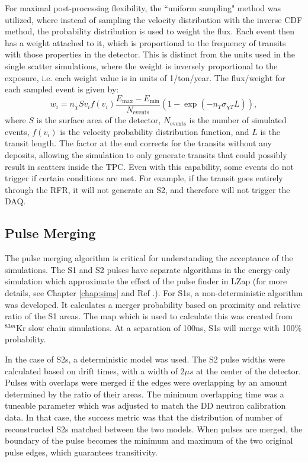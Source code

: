 For maximal post-processing flexibility, the ``uniform sampling" method was utilized, where instead of sampling the velocity distribution with the inverse CDF method, the probability distribution is used to weight the flux.
Each event then has a weight attached to it, which is proportional to the frequency of transits with those properties in the detector.
This is distinct from the units used in the single scatter simulations, where the weight is inversely proportional to the exposure, i.e. each weight value is in units of 1/ton/year.
The flux/weight for each sampled event is given by:
\begin{equation}
    w_i = n_\chi S v_i f(v_i) \frac{E_{\mathrm{max}}-E_{\mathrm{min}}}{N_{\text{events}}} (1-\exp(-n_T \sigma_{\chi T} L)),
\end{equation}
\noindent
where $S$ is the surface area of the detector, $N_{\text{events}}$ is the number of simulated events, $f(v_i)$ is the velocity probability distribution function, and $L$ is the transit length.
The factor at the end corrects for the transits without any deposits, allowing the simulation to only generate transits that could possibly result in scatters inside the TPC.
Even with this capability, some events do not trigger if certain conditions are met.
For example, if the transit goes entirely through the RFR, it will not generate an S2, and therefore will not trigger the DAQ.

\subsection{Pulse Merging}
The pulse merging algorithm is critical for understanding the acceptance of the simulations.
The S1 and S2 pulses have separate algorithms in the energy-only simulation  which approximate the effect of the pulse finder in LZap (for more details, see Chapter \ref{chap:sims} and Ref \cite{akerib_simulations_2021}.).
For S1s, a non-deterministic algorithm was developed.
It calculates a merger probability based on proximity and relative ratio of the S1 areas.
The map which is used to calculate this was created from $^{83m}$Kr slow chain simulations.
At a separation of 100ns, S1s will merge with 100\% probability.

In the case of S2s, a deterministic model was used.
The S2 pulse widths were calculated based on drift times, with a width of $2 \mu s$ at the center of the detector.
Pulses with overlaps were merged if the edges were overlapping by an amount determined by the ratio of their areas.
The minimum overlapping time was a tuneable parameter which was adjusted to match the DD neutron calibration data.
In that case, the success metric was that the distribution of number of reconstructed S2s matched between the two models.
When pulses are merged, the boundary of the pulse becomes the minimum and maximum of the two original pulse edges, which guarantees transitivity.


